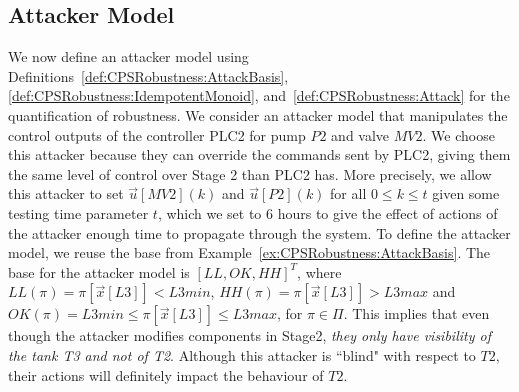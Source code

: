 {%

\subsection{Attacker Model}%
We now define an attacker model using Definitions~\ref{def:CPSRobustness:AttackBasis}, \ref{def:CPSRobustness:IdempotentMonoid}, and~\ref{def:CPSRobustness:Attack} for the quantification of robustness. We consider an attacker model that manipulates the control outputs of the controller PLC2 for pump $P2$ and valve $MV2$. We choose this attacker because they can override the commands sent by PLC2, giving them the same level of control over Stage 2 than PLC2 has. More precisely, we allow this attacker to set $\vec{u}[MV2](k)$ and $\vec{u}[P2](k)$ for all $0\leq k\leq t$ given some testing time parameter $t$, which we set to 6 hours to give the effect of actions of the attacker enough time to propagate through the system. To define the attacker model, we reuse the base from Example~\ref{ex:CPSRobustness:AttackBasis}. The base for the attacker model is $[LL, OK, HH]^T$, where ${LL}(\pi)=\pi[\vec{x}[L3]]<L3min$, ${HH}(\pi)=\pi[\vec{x}[L3]]>L3max$ and ${OK}(\pi)=L3min \leq \pi[\vec{x}[L3]]\leq L3max$, for $\pi \in \Pi$. This implies that even though the attacker modifies components in Stage2, \emph{they only have visibility of the tank T3 and not of T2}. Although this attacker is ``blind" with respect to $T2$, their actions will definitely impact the behaviour of $T2$. 

}
